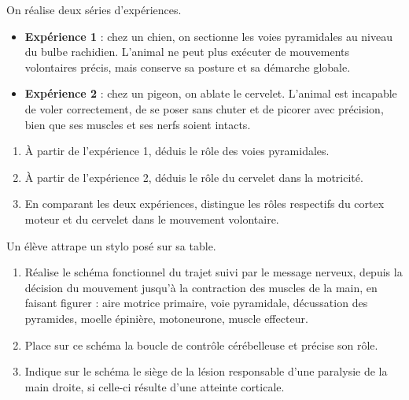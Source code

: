 \documentclass[11pt]{article}
\begin{document}
\begin{exercice}
On réalise deux séries d'expériences.
\begin{itemize}
\item \textbf{Expérience 1} : chez un chien, on sectionne les voies pyramidales au niveau du bulbe rachidien. L'animal ne peut plus exécuter de mouvements volontaires précis, mais conserve sa posture et sa démarche globale.
\item \textbf{Expérience 2} : chez un pigeon, on ablate le cervelet. L'animal est incapable de voler correctement, de se poser sans chuter et de picorer avec précision, bien que ses muscles et ses nerfs soient intacts.
\end{itemize}
\begin{enumerate}
\item À partir de l'expérience 1, déduis le rôle des voies pyramidales.
\item À partir de l'expérience 2, déduis le rôle du cervelet dans la motricité.
\item En comparant les deux expériences, distingue les rôles respectifs du cortex moteur et du cervelet dans le mouvement volontaire.
\end{enumerate}
\end{exercice}

\begin{exercice}
Un élève attrape un stylo posé sur sa table.
\begin{enumerate}
\item Réalise le schéma fonctionnel du trajet suivi par le message nerveux, depuis la décision du mouvement jusqu'à la contraction des muscles de la main, en faisant figurer : aire motrice primaire, voie pyramidale, décussation des pyramides, moelle épinière, motoneurone, muscle effecteur.
\item Place sur ce schéma la boucle de contrôle cérébelleuse et précise son rôle.
\item Indique sur le schéma le siège de la lésion responsable d'une paralysie de la main droite, si celle-ci résulte d'une atteinte corticale.
\end{enumerate}
\end{exercice}
\end{document}
